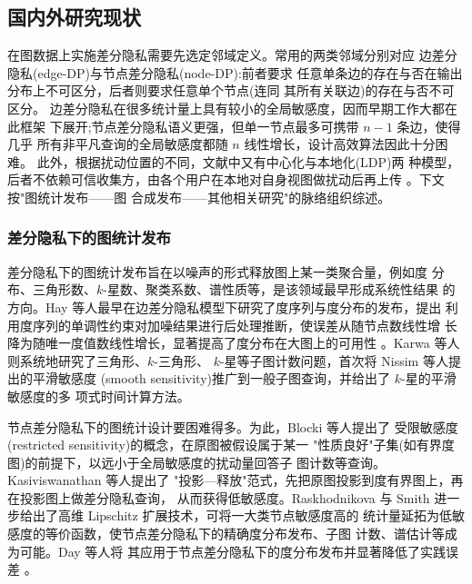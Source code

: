 \subsection{国内外研究现状}

\par 在图数据上实施差分隐私需要先选定邻域定义。常用的两类邻域分别对应
边差分隐私(edge-DP)与节点差分隐私(node-DP):前者要求
任意单条边的存在与否在输出分布上不可区分，后者则要求任意单个节点(连同
其所有关联边)的存在与否不可区分\cite{kasiviswanathan_analyzing_2013,raskhodnikova_lipschitz_2016}。
边差分隐私在很多统计量上具有较小的全局敏感度，因而早期工作大都在此框架
下展开;节点差分隐私语义更强，但单一节点最多可携带 $n-1$ 条边，使得几乎
所有非平凡查询的全局敏感度都随 $n$ 线性增长，设计高效算法因此十分困难。
此外，根据扰动位置的不同，文献中又有中心化与本地化(LDP)两
种模型，后者不依赖可信收集方，由各个用户在本地对自身视图做扰动后再上传
\cite{qin_generating_2017,sun_analyzing_2019}。下文按"图统计发布——图
合成发布——其他相关研究"的脉络组织综述。

\subsubsection{差分隐私下的图统计发布}

\par 差分隐私下的图统计发布旨在以噪声的形式释放图上某一类聚合量，例如度
分布、三角形数、$k$-星数、聚类系数、谱性质等，是该领域最早形成系统性结果
的方向。Hay 等人最早在边差分隐私模型下研究了度序列与度分布的发布，提出
利用度序列的单调性约束对加噪结果进行后处理推断，使误差从随节点数线性增
长降为随唯一度值数线性增长，显著提高了度分布在大图上的可用性
\cite{hay_accurate_2009}。Karwa 等人则系统地研究了三角形、$k$-三角形、
$k$-星等子图计数问题，首次将 Nissim 等人提出的平滑敏感度
(smooth sensitivity)推广到一般子图查询，并给出了 $k$-星的平滑敏感度的多
项式时间计算方法\cite{karwa_private_2014}。

\par 节点差分隐私下的图统计设计要困难得多。为此，Blocki 等人提出了
受限敏感度(restricted sensitivity)的概念，在原图被假设属于某一
"性质良好"子集(如有界度图)的前提下，以远小于全局敏感度的扰动量回答子
图计数等查询\cite{blocki_differentially_2013}。Kasiviswanathan 等人提出了
"投影—释放"范式，先把原图投影到度有界图上，再在投影图上做差分隐私查询，
从而获得低敏感度\cite{kasiviswanathan_analyzing_2013}。Raskhodnikova
与 Smith 进一步给出了高维 Lipschitz 扩展技术，可将一大类节点敏感度高的
统计量延拓为低敏感度的等价函数，使节点差分隐私下的精确度分布发布、子图
计数、谱估计等成为可能\cite{raskhodnikova_lipschitz_2016}。Day 等人将
其应用于节点差分隐私下的度分布发布并显著降低了实践误差
\cite{day_publishing_2016}。

